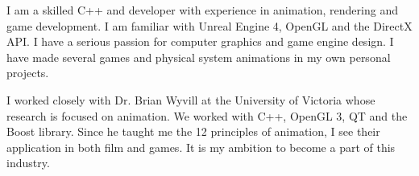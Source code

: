 I am a skilled C++ and developer with experience in animation, rendering and game development.
I am familiar with Unreal Engine 4, OpenGL and the DirectX API.
I have a serious passion for computer graphics and game engine design.
I have made several games and physical system animations in my own personal projects. 



I worked closely with Dr. Brian Wyvill at the University of Victoria whose research is focused on animation.
We worked with C++, OpenGL 3, QT and the Boost library.
Since he taught me the 12 principles of animation, I see their application in both film and games.
It is my ambition to become a part of this industry. 

